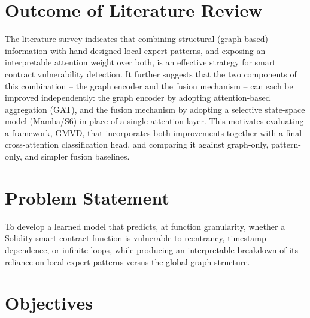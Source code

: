 \documentclass[12pt, a4paper, openright, twoside]{report}
\begin{document}
\section{Outcome of Literature Review}
The literature survey indicates that combining structural (graph-based) information with hand-designed local expert patterns, and exposing an interpretable attention weight over both, is an effective strategy for smart contract vulnerability detection. It further suggests that the two components of this combination -- the graph encoder and the fusion mechanism -- can each be improved independently: the graph encoder by adopting attention-based aggregation (GAT), and the fusion mechanism by adopting a selective state-space model (Mamba/S6) in place of a single attention layer. This motivates evaluating a framework, GMVD, that incorporates both improvements together with a final cross-attention classification head, and comparing it against graph-only, pattern-only, and simpler fusion baselines.


\section{Problem Statement}
To develop a learned model that predicts, at function granularity, whether a Solidity smart contract function is vulnerable to reentrancy, timestamp dependence, or infinite loops, while producing an interpretable breakdown of its reliance on local expert patterns versus the global graph structure.


\section{Objectives}
\end{document}

